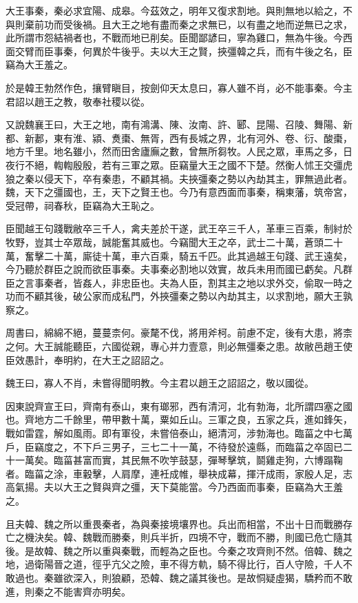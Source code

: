 大王事秦，秦必求宜陽、成皋。今茲效之，明年又復求割地。與則無地以給之，不與則棄前功而受後禍。且大王之地有盡而秦之求無已，以有盡之地而逆無已之求，此所謂市怨結禍者也，不戰而地已削矣。臣聞鄙諺曰，寧為雞口，無為牛後。今西面交臂而臣事秦，何異於牛後乎。夫以大王之賢，挾彊韓之兵，而有牛後之名，臣竊為大王羞之。

於是韓王勃然作色，攘臂瞋目，按劍仰天太息曰，寡人雖不肖，必不能事秦。今主君詔以趙王之教，敬奉社稷以從。

又說魏襄王曰，大王之地，南有鴻溝、陳、汝南、許、郾、昆陽、召陵、舞陽、新都、新郪，東有淮、潁、煑棗、無胥，西有長城之界，北有河外、卷、衍、酸棗，地方千里。地名雖小，然而田舍廬廡之數，曾無所芻牧。人民之眾，車馬之多，日夜行不絕，輷輷殷殷，若有三軍之眾。臣竊量大王之國不下楚。然衡人怵王交彊虎狼之秦以侵天下，卒有秦患，不顧其禍。夫挾彊秦之勢以內劫其主，罪無過此者。魏，天下之彊國也，王，天下之賢王也。今乃有意西面而事秦，稱東藩，筑帝宮，受冠帶，祠春秋，臣竊為大王恥之。

臣聞越王句踐戰敝卒三千人，禽夫差於干遂，武王卒三千人，革車三百乘，制紂於牧野，豈其士卒眾哉，誠能奮其威也。今竊聞大王之卒，武士二十萬，蒼頭二十萬，奮擊二十萬，廝徒十萬，車六百乘，騎五千匹。此其過越王句踐、武王遠矣，今乃聽於群臣之說而欲臣事秦。夫事秦必割地以效實，故兵未用而國已虧矣。凡群臣之言事秦者，皆姦人，非忠臣也。夫為人臣，割其主之地以求外交，偷取一時之功而不顧其後，破公家而成私門，外挾彊秦之勢以內劫其主，以求割地，願大王孰察之。

周書曰，綿綿不絕，蔓蔓柰何。豪氂不伐，將用斧柯。前慮不定，後有大患，將柰之何。大王誠能聽臣，六國從親，專心并力壹意，則必無彊秦之患。故敝邑趙王使臣效愚計，奉明約，在大王之詔詔之。

魏王曰，寡人不肖，未嘗得聞明教。今主君以趙王之詔詔之，敬以國從。

因東說齊宣王曰，齊南有泰山，東有瑯邪，西有清河，北有勃海，北所謂四塞之國也。齊地方二千餘里，帶甲數十萬，粟如丘山。三軍之良，五家之兵，進如鋒矢，戰如雷霆，解如風雨。即有軍役，未嘗倍泰山，絕清河，涉勃海也。臨菑之中七萬戶，臣竊度之，不下戶三男子，三七二十一萬，不待發於遠縣，而臨菑之卒固已二十一萬矣。臨菑甚富而實，其民無不吹竽鼓瑟，彈琴擊筑，鬬雞走狗，六博蹋鞠者。臨菑之涂，車轂擊，人肩摩，連衽成帷，舉袂成幕，揮汗成雨，家殷人足，志高氣揚。夫以大王之賢與齊之彊，天下莫能當。今乃西面而事秦，臣竊為大王羞之。

且夫韓、魏之所以重畏秦者，為與秦接境壤界也。兵出而相當，不出十日而戰勝存亡之機決矣。韓、魏戰而勝秦，則兵半折，四境不守，戰而不勝，則國已危亡隨其後。是故韓、魏之所以重與秦戰，而輕為之臣也。今秦之攻齊則不然。倍韓、魏之地，過衛陽晉之道，徑乎亢父之險，車不得方軌，騎不得比行，百人守險，千人不敢過也。秦雖欲深入，則狼顧，恐韓、魏之議其後也。是故恫疑虛猲，驕矜而不敢進，則秦之不能害齊亦明矣。

